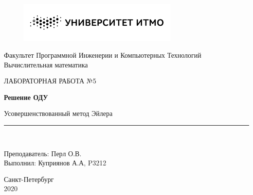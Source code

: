 \documentclass[11pt, english]{article}
\begin{document}
    \begin{titlepage}

        \begin{center}
            \vspace*{-1in}
            \begin{figure}[htb]
                \begin{center}
                    \includegraphics[width=8cm]{bw_w_rus.png}
                \end{center}
            \end{figure}

            Факультет Программной Инженерии и Компьютерных Технологий \\
            \vspace*{0.15in}
            Вычислительная математика \\
            \vspace*{0.4in}
            \begin{large}
                ЛАБОРАТОРНАЯ РАБОТА №5\\
            \end{large}
            \vspace*{0.2in}
            \begin{Large}
                \textbf{Решение ОДУ} \\
            \end{Large}
            \vspace*{0.3in}
            \begin{large}
                Усовершенствованный метод Эйлера \\
            \end{large}
            \vspace*{0.3in}
            \rule{80mm}{0.1mm}\\
            \vspace*{0.1in}
            \begin{large}
                Преподаватель: Перл О.В. \\
                Выполнил: Куприянов А.А, P3212 \\
            \end{large}
            \vspace*{3.6in}

            Санкт-Петербург \\
            2020
        \end{center}
    \end{titlepage}
\end{document}
